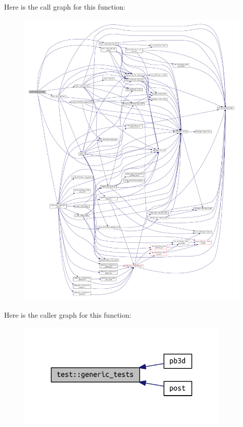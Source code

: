 Here is the call graph for this function\+:
\nopagebreak
\begin{figure}[H]
\begin{center}
\leavevmode
\includegraphics[width=350pt]{namespacetest_aca21ee464c0b1f4b617177afdde110ec_cgraph}
\end{center}
\end{figure}
Here is the caller graph for this function\+:\nopagebreak
\begin{figure}[H]
\begin{center}
\leavevmode
\includegraphics[width=288pt]{namespacetest_aca21ee464c0b1f4b617177afdde110ec_icgraph}
\end{center}
\end{figure}
\mbox{\label{namespacetest_a1c04fcea513c8c2efb189049d810318a}} 
